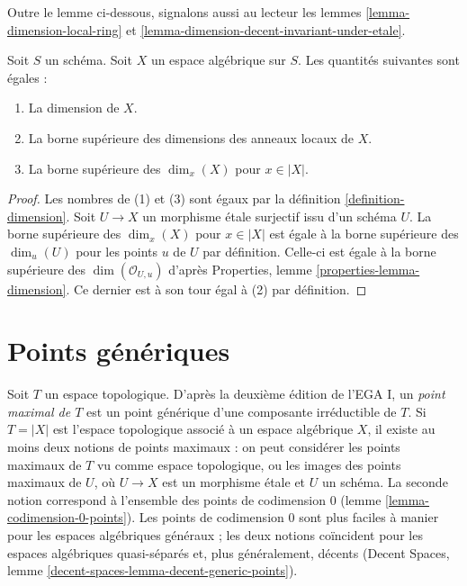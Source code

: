 \noindent
Outre le lemme ci-dessous, signalons aussi au lecteur les
lemmes \ref{lemma-dimension-local-ring} et
\ref{lemma-dimension-decent-invariant-under-etale}.

\begin{lemma}
\label{lemma-dimension}
Soit $S$ un schéma. Soit $X$ un espace algébrique sur $S$.
Les quantités suivantes sont égales :
\begin{enumerate}
\item La dimension de $X$.
\item La borne supérieure des dimensions des anneaux locaux de $X$.
\item La borne supérieure des $\dim_x(X)$ pour $x \in |X|$.
\end{enumerate}
\end{lemma}

\begin{proof}
Les nombres de (1) et (3) sont égaux par la définition \ref{definition-dimension}.
Soit $U \to X$ un morphisme \'etale surjectif issu d'un schéma $U$.
La borne supérieure des $\dim_x(X)$ pour $x \in |X|$ est égale à la
borne supérieure des $\dim_u(U)$ pour les points $u$ de $U$ par définition.
Celle-ci est égale à la borne supérieure des $\dim(\mathcal{O}_{U, u})$ d'après
Properties, lemme \ref{properties-lemma-dimension}. Ce dernier
est à son tour égal à (2) par définition.
\end{proof}




\section{Points génériques}
\label{section-generic-points}

\noindent
Soit $T$ un espace topologique. D'après la deuxième édition de
l'EGA I, un {\it point maximal de $T$} est un point générique d'une composante
irréductible de $T$. Si $T = |X|$ est l'espace topologique associé à
un espace algébrique $X$, il existe au moins deux notions de points maximaux :
on peut considérer les points maximaux de $T$ vu comme espace topologique, ou
les images des points maximaux de $U$, où $U \to X$ est un
morphisme \'etale et $U$ un schéma. La seconde notion correspond à
l'ensemble des points de codimension $0$ (lemme \ref{lemma-codimension-0-points}).
Les points de codimension $0$ sont plus faciles
à manier pour les espaces algébriques généraux ; les deux notions
coïncident pour les espaces algébriques quasi-séparés et, plus généralement, décents
(Decent Spaces, lemme \ref{decent-spaces-lemma-decent-generic-points}).

